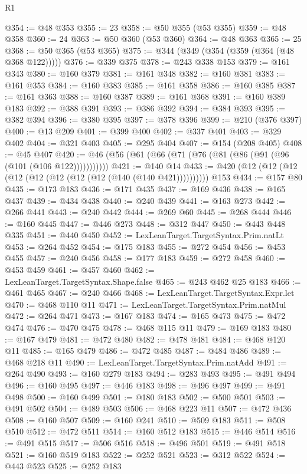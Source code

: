 \begin{lexlean}{R1}
\begin{coremodule}
@354 := @48 @353
@355 := 23
@358 := @50 @355 (@53 @355)
@359 := @48 @358
@360 := 24
@363 := @50 @360 (@53 @360)
@364 := @48 @363
@365 := 25
@368 := @50 @365 (@53 @365)
@375 := @344 (@349 (@354 (@359 (@364 (@48 @368 @122)))))
@376 := @339 @375
@378 := @243 @338 @153
@379 := @161 @343
@380 := @160 @379
@381 := @161 @348
@382 := @160 @381
@383 := @161 @353
@384 := @160 @383
@385 := @161 @358
@386 := @160 @385
@387 := @161 @363
@388 := @160 @387
@389 := @161 @368
@391 := @160 @389 @183
@392 := @388 @391
@393 := @386 @392
@394 := @384 @393
@395 := @382 @394
@396 := @380 @395
@397 := @378 @396
@399 := @210 (@376 @397)
@400 := @13 @209
@401 := @399 @400
@402 := @337 @401
@403 := @329 @402
@404 := @321 @403
@405 := @295 @404
@407 := @154 (@208 @405)
@408 := @45 @407
@420 := @46 (@56 (@61 (@66 (@71 (@76 (@81 (@86 (@91 (@96 (@101 (@106 @122)))))))))))
@421 := @140 @14
@433 := @420 (@12 (@12 (@12 (@12 (@12 (@12 (@12 (@12 (@140 (@140 @421)))))))))) @153
@434 := @157 @80
@435 := @173 @183
@436 := @171 @435
@437 := @169 @436
@438 := @165 @437
@439 := @434 @438
@440 := @240 @439
@441 := @163 @273
@442 := @266 @441
@443 := @240 @442
@444 := @269 @60
@445 := @268 @444
@446 := @160 @445
@447 := @446 @273
@448 := @312 @447
@450 := @443 @448 @335
@451 := @440 @450
@452 := LexLeanTarget.TargetSyntax.Prim.natLt
@453 := @264 @452
@454 := @175 @183
@455 := @272 @454
@456 := @453 @455
@457 := @240 @456
@458 := @177 @183
@459 := @272 @458
@460 := @453 @459
@461 := @457 @460
@462 := LexLeanTarget.TargetSyntax.Shape.false
@465 := @243 @462 @25 @183
@466 := @461 @465
@467 := @240 @466
@468 := LexLeanTarget.TargetSyntax.Expr.let
@470 := @468 @110 @11
@471 := LexLeanTarget.TargetSyntax.Prim.natMul
@472 := @264 @471
@473 := @167 @183
@474 := @165 @473
@475 := @472 @474
@476 := @470 @475
@478 := @468 @115 @11
@479 := @169 @183
@480 := @167 @479
@481 := @472 @480
@482 := @478 @481
@484 := @468 @120 @11
@485 := @165 @479
@486 := @472 @485
@487 := @484 @486
@489 := @468 @218 @11
@490 := LexLeanTarget.TargetSyntax.Prim.natAdd
@491 := @264 @490
@493 := @160 @279 @183
@494 := @283 @493
@495 := @491 @494
@496 := @160 @495
@497 := @446 @183
@498 := @496 @497
@499 := @491 @498
@500 := @160 @499
@501 := @180 @183
@502 := @500 @501
@503 := @491 @502
@504 := @489 @503
@506 := @468 @223 @11
@507 := @472 @436
@508 := @160 @507
@509 := @160 @241
@510 := @509 @183
@511 := @508 @510
@512 := @472 @511
@514 := @160 @512 @183
@515 := @446 @514
@516 := @491 @515
@517 := @506 @516
@518 := @496 @501
@519 := @491 @518
@521 := @160 @519 @183
@522 := @252 @521
@523 := @312 @522
@524 := @443 @523
@525 := @252 @183

\end{coremodule}
\end{lexlean}
